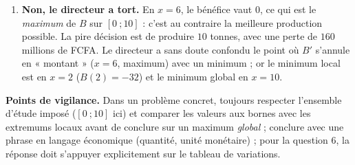 \documentclass[11pt]{article}
\begin{document}
\begin{corrige}
\begin{enumerate}
Pour $x \in [0\ ; 10]$ : $-x \leq 0$ et $(x-6)^2 \geq 0$, donc $B(x) = -x(x-6)^2 \leq 0$ pour \emph{toute} production. Le bénéfice n'est \textbf{jamais strictement positif} : l'ensemble des productions pour lesquelles l'entreprise est bénéficiaire est \textbf{vide}. Le mieux qu'elle puisse faire est d'équilibrer ses comptes ($B = 0$ en $x = 6$).
\item \textbf{Non, le directeur a tort.} En $x = 6$, le bénéfice vaut $0$, ce qui est le \emph{maximum} de $B$ sur $[0\ ; 10]$ : c'est au contraire la meilleure production possible. La pire décision est de produire $10$ tonnes, avec une perte de $160$ millions de FCFA. Le directeur a sans doute confondu le point où $B'$ s'annule en « montant » ($x = 6$, maximum) avec un minimum ; or le minimum local est en $x = 2$ ($B(2) = -32$) et le minimum global en $x = 10$.
\end{enumerate}

\textbf{Points de vigilance.} Dans un problème concret, toujours respecter l'ensemble d'étude imposé ($[0\ ; 10]$ ici) et comparer les valeurs aux bornes avec les extremums locaux avant de conclure sur un maximum \emph{global} ; conclure avec une phrase en langage économique (quantité, unité monétaire) ; pour la question 6, la réponse doit s'appuyer explicitement sur le tableau de variations.
\end{corrige}
\end{document}
